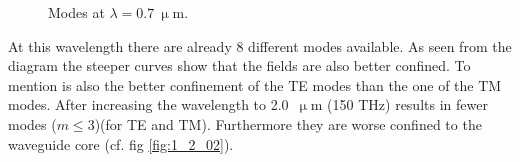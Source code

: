 \begin{figure}[h]
\caption{Modes at $\lambda = 0.7~\upmu$m.}%
\label{fig:1_0307}%
\end{figure}

At this wavelength there are already 8 different modes available. As seen from the diagram the steeper curves show that the fields are also better confined. To mention is also the better confinement of the TE modes than the one of the TM modes.
After increasing the wavelength to 2.0~$\upmu$m (150 THz) results in fewer modes ($m \leq 3$)(for TE and TM). Furthermore they are worse confined to the waveguide core (cf. fig \ref{fig:1_2_02}).


